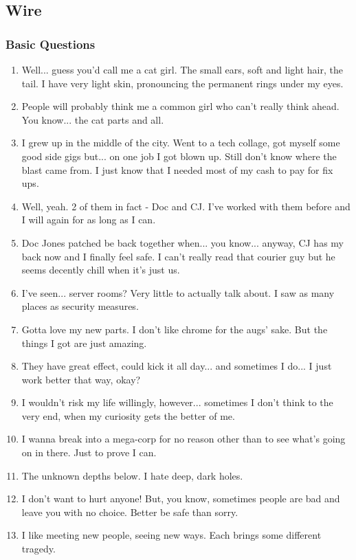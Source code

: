 \def\pfcname{Wire}
\subsection{\pfcname}
\subsubsection{Basic Questions}
\begin{enumerate}
	\setlength\itemsep{-8mm}
	\item Well... guess you'd call me a cat girl. The small ears, soft and light hair, the tail. I have very light skin, pronouncing the permanent rings under my eyes.
	\item People will probably think me a common girl who can't really think ahead. You know... the cat parts and all.
	\item I grew up in the middle of the city. Went to a tech collage, got myself some good side gigs but... on one job I got blown up. Still don't know where the blast came from. I just know that I needed most of my cash to pay for fix ups.
	\item Well, yeah. 2 of them in fact - Doc and CJ. I've worked with them before and I will again for as long as I can.
	\item Doc Jones patched be back together when... you know... anyway, CJ has my back now and I finally feel safe. I can't really read that courier guy but he seems decently chill when it's just us.
	\item I've seen... server rooms? Very little to actually talk about. I saw as many places as security measures.
	\item Gotta love my new parts. I don't like chrome for the augs' sake. But the things I got are just amazing.
	\item They have great effect, could kick it all day... and sometimes I do... I just work better that way, okay?
	\item I wouldn't risk my life willingly, however... sometimes I don't think to the very end, when my curiosity gets the better of me.
	\item I wanna break into a mega-corp for no reason other than to see what's going on in there. Just to prove I can.
	\item The unknown depths below. I hate deep, dark holes.
	\item I don't want to hurt anyone! But, you know, sometimes people are bad and leave you with no choice. Better be safe than sorry.
	\item I like meeting new people, seeing new ways. Each brings some different tragedy.

\end{enumerate}
